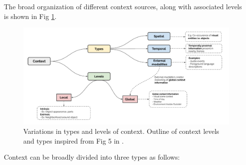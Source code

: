 The broad organization of different context sources, along with associated levels is shown in Fig \ref{Context_type}.
\begin{figure}[t]
  \centering
  \includegraphics[width=\linewidth]{figures/Context_type.pdf}
  \caption{Variations in types and levels of context. Outline of context levels and types inspired from Fig 5 in \cite{contextvision}.}
  \label{Context_type}
\end{figure}
Context can be broadly divided into three types as follows:

